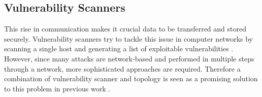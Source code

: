 \subsection{Vulnerability Scanners}
\label{chap:vulnerability_scanners}

This rise in communication makes it crucial data to be transferred and stored securely. Vulnerability scanners try to tackle this issue in computer networks by scanning a single host and generating a list of exploitable vulnerabilities \cite{deraison1999nessus, farmer1990cops, clair}. However, since many attacks are network-based and performed in multiple steps through a network, more sophisticated approaches are required. Therefore a combination of vulnerability scanner and topology is seen as a promising solution to this problem in previous work \cite{sheyner2002automated, ingols2006practical}.
